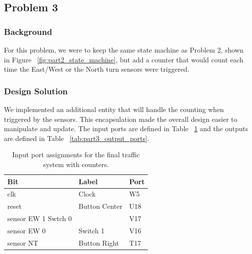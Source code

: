 \documentclass[11pt]{article}
\begin{document}
\subsection{Problem 3}

\subsubsection{Background}
For this problem, we were to keep the same state machine as Problem 2, shown in Figure ~\ref{fig:part2_state_machine}, but add a counter that would count each time the East/West or the North turn sensors were triggered.

\subsubsection{Design Solution}
We implemented an additional entity that will handle the counting when triggered by the sensors. This encapsulation made the overall design easier to manipulate and update. The input ports are defined in Table ~\ref{tab:part3_input_ports} and the outputs are defined in Table ~\ref{tab:part3_output_ports}.

\begin{table}[H]
\begin{center}
\begin{tabular}{| l | l | l |}
	\hline
	Bit & Label & Port \\ \hline
	clk &  Clock & W5 \\ \hline
	reset & Button Center & U18 \\ \hline
	 sensor EW 1 Swtch 0 & & V17 \\ \hline
	sensor EW 0 & Switch 1 & V16 \\ \hline
	sensor NT & Button Right& T17 \\ \hline
\end{tabular}
\caption{\label{tab:part3_input_ports}Input port assignments for  the final traffic system with counters.}
\end{center}
\end{table}
\end{document}
